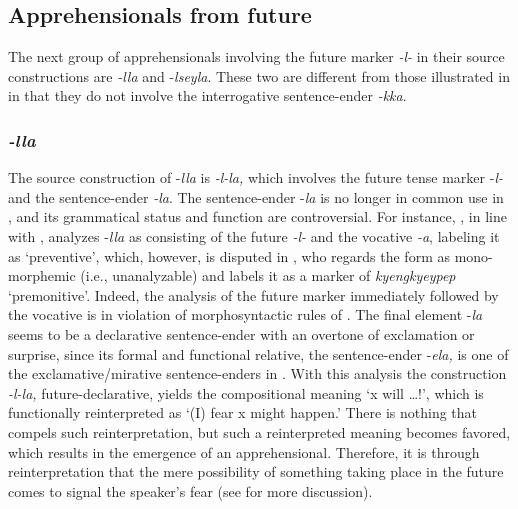\documentclass[output=paper,colorlinks,citecolor=brown]{langscibook}
\begin{document}
\subsection{Apprehensionals from future}
\label{subsec:future}

The next group of apprehensionals involving the future marker \textit{-l-} in their source constructions are \textit{-lla} and \nobreakdash-\textit{lseyla}. These two are different from those illustrated in  in that they do not involve the interrogative sentence-ender \textit{-kka}.

\subsubsection{\textit{-lla}}
\largerpage
The source construction of \nobreakdash-\textit{lla} is \textit{-l-la,} which involves the future tense marker \nobreakdash-\textit{l-} and the sentence-ender \textit{-la}. The sentence-ender \nobreakdash-\textit{la} is no longer in common use in , and its grammatical status and function are controversial. For instance, \citet[85]{Ramstedt1997}, in line with \citet{Underwood1915}, analyzes \nobreakdash-\textit{lla} as consisting of the future \textit{-l-} and the vocative \textit{-a}, labeling it as `preventive', which, however, is disputed in \citet[293, 341--342]{Ko1989}, who regards the form as mono-morphemic (i.e., unanalyzable) and labels it as a marker of \textit{kyengkyeypep} `premonitive'. Indeed, the analysis of the future marker immediately followed by the vocative is in violation of morphosyntactic rules of . The final element \nobreakdash-\textit{la} seems to be a declarative sentence-ender with an overtone of exclamation or surprise, since its formal and functional relative, the sentence-ender \nobreakdash-\textit{ela,} is one of the exclamative/mirative sentence-enders in . With this analysis the construction \textit{-l-la,} future-declarative, yields the compositional meaning `x will …!', which is functionally reinterpreted as `(I) fear x might happen.' There is nothing that compels such reinterpretation, but such a reinterpreted meaning becomes favored, which results in the emergence of an apprehensional. Therefore, it is through reinterpretation that the mere possibility of something taking place in the future comes to signal the speaker's fear (see  for more discussion).
\end{document}
